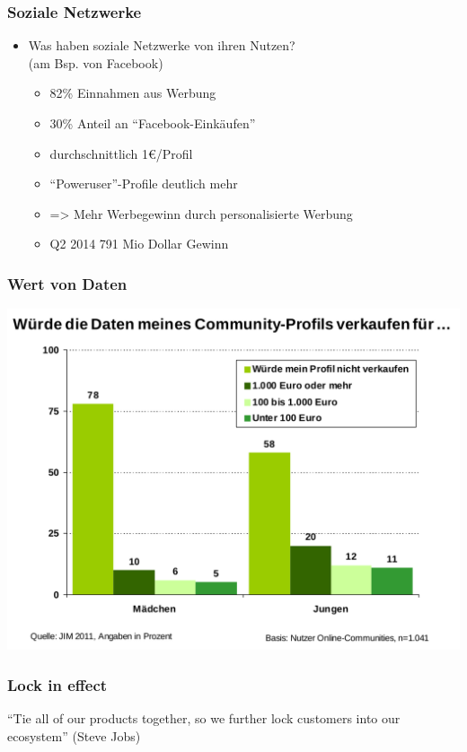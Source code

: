 \documentclass[12pt]{beamer}
\begin{document}
\begin{frame}
  \frametitle{Soziale Netzwerke}

  \begin{itemize}
    \item Was haben soziale Netzwerke von ihren Nutzen?\\(am Bsp. von Facebook)
      \begin{itemize}
        \item<2-> 82\% Einnahmen aus Werbung
        \item<3-> 30\% Anteil an "`Facebook-Einkäufen"'
        \item<4-> durchschnittlich 1€/Profil
        \item<5-> "`Poweruser"'-Profile deutlich mehr
        \item<6-> => Mehr Werbegewinn durch personalisierte Werbung
        \item<7-> Q2 2014 791 Mio Dollar Gewinn
      \end{itemize}
  \end{itemize}
\end{frame}

\begin{frame}
  \frametitle{Wert von Daten}
  \pause
  \begin{center}
    \includegraphics[height=0.7\textheight]{img/jim_verkaufen.png}
  \end{center}
\end{frame}

\begin{frame}
  \frametitle{Lock in effect}
  \begin{center}
    ``Tie all of our products together, so we further lock customers into our ecosystem'' (Steve Jobs)
  \end{center}
\end{frame}
\end{document}
